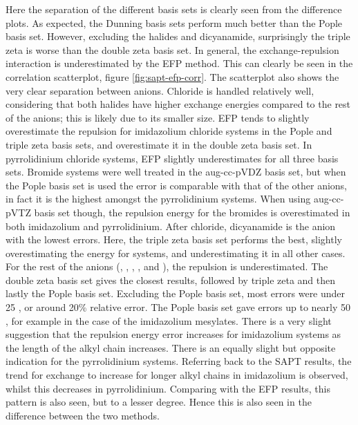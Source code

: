 Here the separation of the different basis sets is clearly seen from the difference plots.
As expected, the Dunning basis sets perform much better than the Pople basis set. 
However, excluding the halides and dicyanamide, surprisingly the triple zeta is worse than the double zeta basis set.
In general, the exchange-repulsion interaction is underestimated by the EFP method. 
This can clearly be seen in the correlation scatterplot, figure
\ref{fig:sapt-efp-corr}.
The scatterplot also shows the very clear separation between anions.
Chloride is handled relatively well, considering that both halides have higher exchange energies compared to the rest of the anions; this is likely due to its smaller size.
EFP tends to slightly overestimate the repulsion for imidazolium chloride systems in the Pople and triple zeta basis sets, and overestimate it in the double zeta basis set.
In pyrrolidinium chloride systems, EFP slightly underestimates for all three basis sets. 
Bromide systems were well treated in the aug-cc-pVDZ basis set, but when the Pople basis set is used the error is comparable with that of the other anions, in fact it is the highest amongst the pyrrolidinium systems.
When using aug-cc-pVTZ basis set though, the repulsion energy for the bromides is overestimated in both imidazolium and pyrrolidinium.
After chloride, dicyanamide is the anion with the lowest errors.
Here, the triple zeta basis set performs the best, slightly overestimating the energy for  systems, and underestimating it in all other cases.
For the rest of the anions (\bfl, \mes, \ntf, \pf, and \tos), the repulsion is underestimated. 
The double zeta basis set gives the closest results, followed by triple zeta and then lastly the Pople basis set.
Excluding the Pople basis set, most errors were under 25 \enUnit, or around 20\% relative error.
The Pople basis set gave errors up to nearly 50 \enUnit, for example in the case of the imidazolium mesylates.
There is a very slight suggestion that the repulsion energy error increases for imidazolium systems as the length of the alkyl chain increases. 
There is an equally slight but opposite indication for the pyrrolidinium systems.
Referring back to the SAPT results, the trend for exchange to increase for longer alkyl chains in imidazolium is observed, whilst this decreases in pyrrolidinium. 
Comparing with the EFP results, this pattern is also seen, but to a lesser degree.
Hence this is also seen in the difference between the two methods.

